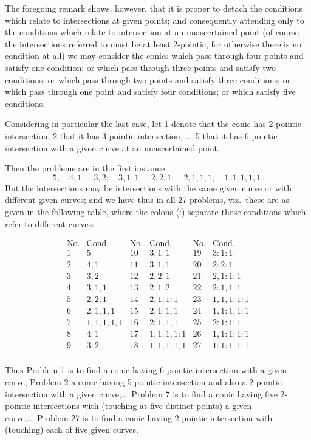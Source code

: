 \documentclass[11pt,a4paper]{article}
\theoremstyle{plain}
\theoremstyle{definition}
\theoremstyle{remark}
\begin{document}
The foregoing remark shows, however, that it is proper to detach the conditions which relate to intersections at given points; and consequently attending only to the conditions which relate to intersection at an unascertained point (of course the intersections referred to must be at least 2-pointic, for otherwise there is no condition at all) we may consider the conics which pass through four points and satisfy one condition; or which pass through three points and satisfy two conditions; or which pass through two points and satisfy three conditions; or which pass through one point and satisfy four conditions; or which satisfy five conditions.

Considering in particular the last case, let 1 denote that the conic has 2-pointic intersection, 2 that it has 3-pointic intersection, \dots\ 5 that it has 6-pointic intersection with a given curve at an unascertained point.

Then the problems are in the first instance
\[
5; \quad 4,1; \quad 3,2; \quad 3,1,1; \quad 2,2,1; \quad 2,1,1,1; \quad 1,1,1,1,1.
\]
But the intersections may be intersections with the same given curve or with different given curves; and we have thus in all 27 problems, viz.\ these are as given in the following table, where the colons (:) separate those conditions which refer to different curves:

\[
\begin{array}{c|c|c|c|c|c|c|c|c}
\text{No.} & \text{Cond.} & \text{No.} & \text{Cond.} & \text{No.} & \text{Cond.} \\
\hline
1 & 5 & 10 & 3,1:1 & 19 & 3:1:1 \\
2 & 4,1 & 11 & 3:1,1 & 20 & 2:2:1 \\
3 & 3,2 & 12 & 2,2:1 & 21 & 2,1:1:1 \\
4 & 3,1,1 & 13 & 2,1:2 & 22 & 2:1,1:1 \\
5 & 2,2,1 & 14 & 2,1,1:1 & 23 & 1,1,1:1:1 \\
6 & 2,1,1,1 & 15 & 2,1:1,1 & 24 & 1,1:1,1:1 \\
7 & 1,1,1,1,1 & 16 & 2:1,1,1 & 25 & 2:1:1:1 \\
8 & 4:1 & 17 & 1,1,1,1:1 & 26 & 1,1:1:1:1 \\
9 & 3:2 & 18 & 1,1,1:1,1 & 27 & 1:1:1:1:1 \\
\end{array}
\]

Thus Problem 1 is to find a conic having 6-pointic intersection with a given curve; Problem 2 a conic having 5-pointic intersection and also a 2-pointic intersection with a given curve;\dots\ Problem 7 is to find a conic having five 2-pointic intersections with (touching at five distinct points) a given curve;\dots\ Problem 27 is to find a conic having 2-pointic intersection with (touching) each of five given curves.
\end{document}
